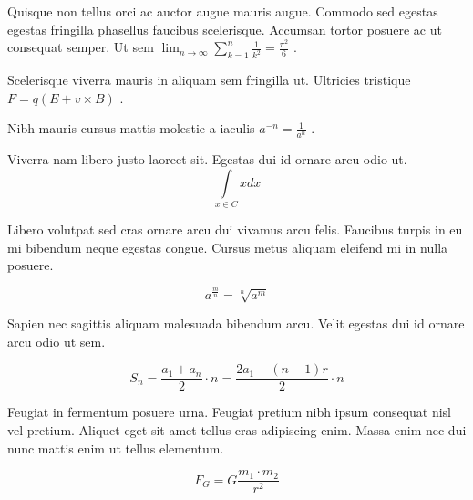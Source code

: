 \documentclass{article}
\begin{document}
Quisque non tellus orci ac auctor augue mauris augue. Commodo sed egestas egestas fringilla phasellus faucibus scelerisque. Accumsan tortor posuere ac ut consequat semper. Ut sem 
\begin{math}
	\lim_{n \to \infty}\sum_{k=1}^n \frac{1}{k^2}= \frac{\pi^2}{6}
\end{math}
.\newline

Scelerisque viverra mauris in aliquam sem fringilla ut. Ultricies tristique 
$ F=q\left ( E+v \times B \right ) $
.\newline

Nibh mauris cursus mattis molestie a iaculis 
\( a^{-n}=\frac{1}{a^{n}} \)
.\newline

Viverra nam libero justo laoreet sit. Egestas dui id ornare arcu odio ut.
\[ \int\limits_{x\in C}xdx \]

Libero volutpat sed cras ornare arcu dui vivamus arcu felis. Faucibus turpis in eu mi bibendum neque egestas congue. Cursus metus aliquam eleifend mi in nulla posuere.

$$ a^{\frac{m}{n}}=\sqrt[n]{a^{m}} $$

Sapien nec sagittis aliquam malesuada bibendum arcu. Velit egestas dui id ornare arcu odio ut sem. 

\begin{displaymath}
	S_{n}=\frac{a_{1}+a_{n}}{2}\cdot n=\frac{2a_{1}+(n-1)r}{2}\cdot n
\end{displaymath}

Feugiat in fermentum posuere urna. Feugiat pretium nibh ipsum consequat nisl vel pretium. Aliquet eget sit amet tellus cras adipiscing enim. Massa enim nec dui nunc mattis enim ut tellus elementum.

\begin{equation}
	F_{G}=G\frac{m_1\cdot m_2}{r^2}
\end{equation}
\end{document}
